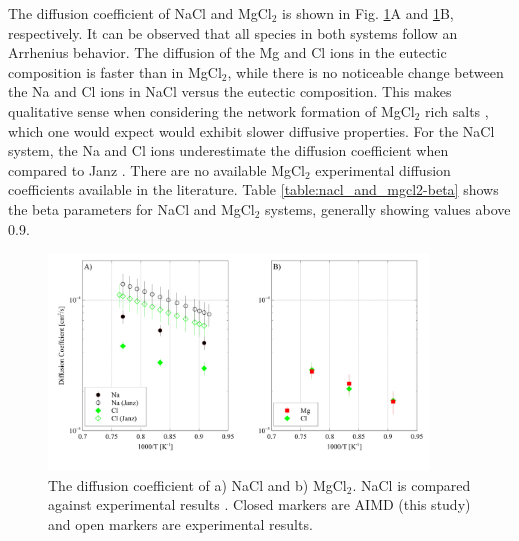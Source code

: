 \documentclass[review]{elsarticle}
\begin{document}
 The diffusion coefficient of NaCl and MgCl$_2$ is shown in Fig. \ref{fig:NaCl_and_MgCl2-diffuion}A and \ref{fig:NaCl_and_MgCl2-diffuion}B, respectively. It can be observed that all species in both systems follow an Arrhenius behavior. The diffusion of the Mg and Cl ions in the eutectic composition is faster than in MgCl$_2$, while there is no noticeable change between the Na and Cl ions in NaCl versus the eutectic composition. This makes qualitative sense when considering the network formation of MgCl$_2$ rich salts \cite{LIANG2020}, which one would expect would exhibit slower diffusive properties. For the NaCl system, the Na and Cl ions underestimate the diffusion coefficient when compared to Janz \cite{janz_Diffusion}. There are no available MgCl$_2$ experimental diffusion coefficients available in the literature. Table \ref{table:nacl_and_mgcl2-beta} shows the beta parameters for NaCl and MgCl$_2$ systems, generally showing values above 0.9. 


\begin{figure}[!h]
 \centering
 \includegraphics[width=0.9\textwidth]{diff_nacl_and_mgcl2.jpg} 
 \caption{The diffusion coefficient of a) NaCl and b) MgCl$_2$. NaCl is compared against experimental results \cite{janz_Diffusion}. Closed markers are AIMD (this study) and open markers are experimental results.}
 \label{fig:NaCl_and_MgCl2-diffuion}
\end{figure}
\end{document}
